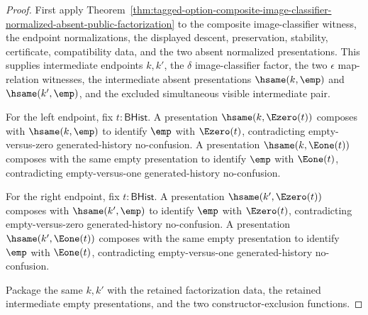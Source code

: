 \begin{proof}
First apply
Theorem~\ref{thm:tagged-option-composite-image-classifier-normalized-absent-public-factorization}
to the composite image-classifier witness, the endpoint normalizations, the
displayed descent, preservation, stability, certificate, compatibility data,
and the two absent normalized presentations. This supplies intermediate
endpoints $k,k'$, the $\delta$ image-classifier factor, the two $\epsilon$
map-relation witnesses, the intermediate absent presentations
$\hsame(k,\emp)$ and $\hsame(k',\emp)$, and the excluded simultaneous visible
intermediate pair.

For the left endpoint, fix $t:\mathsf{BHist}$. A presentation
$\hsame(k,\Ezero(t))$ composes with $\hsame(k,\emp)$ to identify $\emp$ with
$\Ezero(t)$, contradicting empty-versus-zero generated-history no-confusion. A
presentation $\hsame(k,\Eone(t))$ composes with the same empty presentation to
identify $\emp$ with $\Eone(t)$, contradicting empty-versus-one generated-history
no-confusion.

For the right endpoint, fix $t:\mathsf{BHist}$. A presentation
$\hsame(k',\Ezero(t))$ composes with $\hsame(k',\emp)$ to identify $\emp$ with
$\Ezero(t)$, contradicting empty-versus-zero generated-history no-confusion. A
presentation $\hsame(k',\Eone(t))$ composes with the same empty presentation to
identify $\emp$ with $\Eone(t)$, contradicting empty-versus-one generated-history
no-confusion.

Package the same $k,k'$ with the retained factorization data, the retained
intermediate empty presentations, and the two constructor-exclusion functions.
\end{proof}

